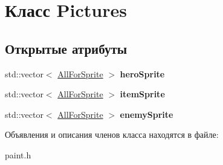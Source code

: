 \hypertarget{classPictures}{}\section{Класс Pictures}
\label{classPictures}
\subsection*{Открытые атрибуты}
\begin{DoxyCompactItemize}
\item 
\mbox{\label{classPictures_ad46c4a36a1e3cdb837e38830a12fe2d0}} 
std\+::vector$<$ \hyperlink{classAllForSprite}{All\+For\+Sprite} $>$ {\bfseries hero\+Sprite}
\item 
\mbox{\label{classPictures_aaafab90598c02ca0cf4f0ea34b2b0a39}} 
std\+::vector$<$ \hyperlink{classAllForSprite}{All\+For\+Sprite} $>$ {\bfseries item\+Sprite}
\item 
\mbox{\label{classPictures_a02d9f21b99132e4b83275bd85bc7c069}} 
std\+::vector$<$ \hyperlink{classAllForSprite}{All\+For\+Sprite} $>$ {\bfseries enemy\+Sprite}
\end{DoxyCompactItemize}


Объявления и описания членов класса находятся в файле\+:\begin{DoxyCompactItemize}
\item 
paint.\+h\end{DoxyCompactItemize}

